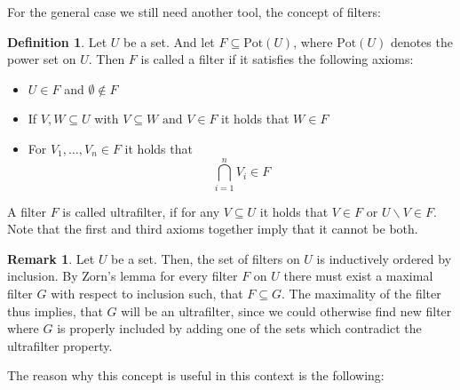 \documentclass{article}
\theoremstyle{definition}
\newtheorem{rem}[Satz]{Remark}
\newtheorem{defn}[Satz]{Definition}
\begin{document}
For the general case we still need another tool, the concept of filters:

\begin{defn}
Let $U$ be a set. And let $F \subseteq \text{Pot}(U)$, where $\text{Pot}(U)$ denotes the power set on $U$. Then $F$ is called a filter if it satisfies the following axioms: 
\begin{itemize}
\item  $U \in F$ and $\emptyset \notin F$
\item If $V,W \subseteq U$ with $V \subseteq W \text{ and }V  \in F $ it holds that $W \in F$
\item For $V_1, \ldots, V_n \in F$ it holds that \[ \bigcap_{i = 1}^n V_i \in F \]
\end{itemize}
A filter $F$ is called ultrafilter, if for any $V \subseteq U$ it holds that $V \in F$ or $U \backslash V \in F$. Note that the first and third axioms together imply that it cannot be both.
\end{defn}

\begin{rem}
Let $U$ be a set. Then, the set of filters on $U$ is inductively ordered by inclusion. By Zorn's lemma for every filter $F$ on $U$ there must exist a maximal filter $G$ with respect to inclusion such, that $F \subseteq G$.
The maximality of the filter thus implies, that $G$ will be an ultrafilter, since we could otherwise find new filter where $G$ is properly included by adding one of the sets which contradict the ultrafilter property.
\end{rem}

The reason why this concept is useful in this context is the following:
\end{document}
